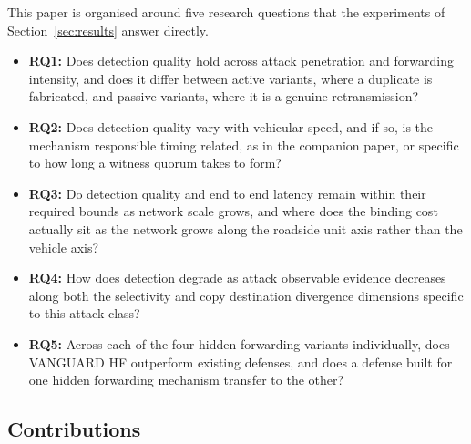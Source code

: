\documentclass[final,5p,twocolumn]{elsarticle}
\theoremstyle{remark}
\theoremstyle{plain}
\begin{document}
This paper is organised around five research questions that the
experiments of Section~\ref{sec:results} answer directly.
\begin{itemize}
	\item \textbf{RQ1:} Does detection quality hold across attack
	penetration and forwarding intensity, and does it differ between
	active variants, where a duplicate is fabricated, and passive
	variants, where it is a genuine retransmission?
	\item \textbf{RQ2:} Does detection quality vary with vehicular speed,
	and if so, is the mechanism responsible timing related, as in the
	companion paper, or specific to how long a witness quorum takes to
	form?
	\item \textbf{RQ3:} Do detection quality and end to end latency remain
	within their required bounds as network scale grows, and where does
	the binding cost actually sit as the network grows along the roadside
	unit axis rather than the vehicle axis?
	\item \textbf{RQ4:} How does detection degrade as attack observable
	evidence decreases along both the selectivity and copy destination
	divergence dimensions specific to this attack class?
	\item \textbf{RQ5:} Across each of the four hidden forwarding variants
	individually, does VANGUARD HF outperform existing defenses, and does
	a defense built for one hidden forwarding mechanism transfer to the
	other?
\end{itemize}

\subsection{Contributions}
\end{document}

